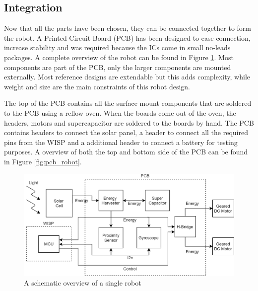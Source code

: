 \subsection{Integration}

Now that all the parts have been chosen, they can be connected together to form the robot.
A Printed Circuit Board (PCB) has been designed to ease connection, increase stability and was required because the ICs come in small no-leads packages.
A complete overview of the robot can be found in Figure \ref{fig:robot_overview}.
Most components are part of the PCB, only the larger components are mounted externally.
Most reference designs are extendable but this adds complexity, while weight and size are the main constraints of this robot design.


The top of the PCB contains all the surface mount components that are soldered to the PCB using a reflow oven. 
When the boards come out of the oven, the headers, motors and supercapacitor are soldered to the boards by hand.
The PCB contains headers to connect the solar panel, a header to connect all the required pins from the WISP and a additional header to connect a battery for testing purposes.
A overview of both the top and bottom side of the PCB can be found in Figure \ref{fig:pcb_robot}.




\begin{figure}
	\centering
	\includegraphics[width=\textwidth]{pics/schematic_robot_v2.png}
	\caption{A schematic overview of a single robot}
	\label{fig:robot_overview}
\end{figure}


